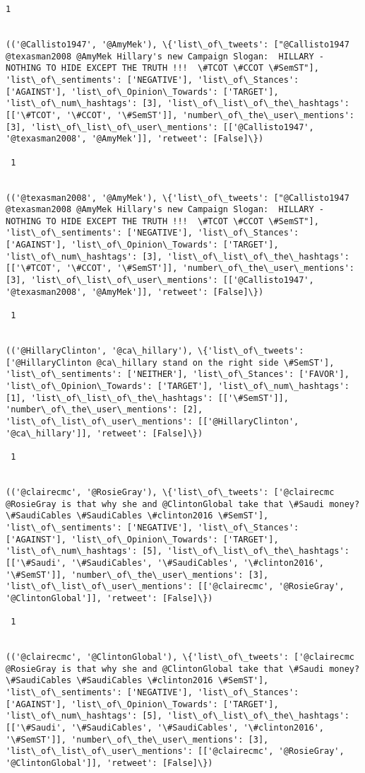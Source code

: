 \documentclass[11pt]{article}
\begin{document}
\begin{Verbatim}[commandchars=\\\{\}]
 1
 

(('@Callisto1947', '@AmyMek'), \{'list\_of\_tweets': ["@Callisto1947 @texasman2008 @AmyMek Hillary's new Campaign Slogan:  HILLARY - NOTHING TO HIDE EXCEPT THE TRUTH !!!  \#TCOT \#CCOT \#SemST"], 'list\_of\_sentiments': ['NEGATIVE'], 'list\_of\_Stances': ['AGAINST'], 'list\_of\_Opinion\_Towards': ['TARGET'], 'list\_of\_num\_hashtags': [3], 'list\_of\_list\_of\_the\_hashtags': [['\#TCOT', '\#CCOT', '\#SemST']], 'number\_of\_the\_user\_mentions': [3], 'list\_of\_list\_of\_user\_mentions': [['@Callisto1947', '@texasman2008', '@AmyMek']], 'retweet': [False]\})

 1
 

(('@texasman2008', '@AmyMek'), \{'list\_of\_tweets': ["@Callisto1947 @texasman2008 @AmyMek Hillary's new Campaign Slogan:  HILLARY - NOTHING TO HIDE EXCEPT THE TRUTH !!!  \#TCOT \#CCOT \#SemST"], 'list\_of\_sentiments': ['NEGATIVE'], 'list\_of\_Stances': ['AGAINST'], 'list\_of\_Opinion\_Towards': ['TARGET'], 'list\_of\_num\_hashtags': [3], 'list\_of\_list\_of\_the\_hashtags': [['\#TCOT', '\#CCOT', '\#SemST']], 'number\_of\_the\_user\_mentions': [3], 'list\_of\_list\_of\_user\_mentions': [['@Callisto1947', '@texasman2008', '@AmyMek']], 'retweet': [False]\})

 1
 

(('@HillaryClinton', '@ca\_hillary'), \{'list\_of\_tweets': ['@HillaryClinton @ca\_hillary stand on the right side \#SemST'], 'list\_of\_sentiments': ['NEITHER'], 'list\_of\_Stances': ['FAVOR'], 'list\_of\_Opinion\_Towards': ['TARGET'], 'list\_of\_num\_hashtags': [1], 'list\_of\_list\_of\_the\_hashtags': [['\#SemST']], 'number\_of\_the\_user\_mentions': [2], 'list\_of\_list\_of\_user\_mentions': [['@HillaryClinton', '@ca\_hillary']], 'retweet': [False]\})

 1
 

(('@clairecmc', '@RosieGray'), \{'list\_of\_tweets': ['@clairecmc @RosieGray is that why she and @ClintonGlobal take that \#Saudi money? \#SaudiCables \#SaudiCables \#clinton2016 \#SemST'], 'list\_of\_sentiments': ['NEGATIVE'], 'list\_of\_Stances': ['AGAINST'], 'list\_of\_Opinion\_Towards': ['TARGET'], 'list\_of\_num\_hashtags': [5], 'list\_of\_list\_of\_the\_hashtags': [['\#Saudi', '\#SaudiCables', '\#SaudiCables', '\#clinton2016', '\#SemST']], 'number\_of\_the\_user\_mentions': [3], 'list\_of\_list\_of\_user\_mentions': [['@clairecmc', '@RosieGray', '@ClintonGlobal']], 'retweet': [False]\})

 1
 

(('@clairecmc', '@ClintonGlobal'), \{'list\_of\_tweets': ['@clairecmc @RosieGray is that why she and @ClintonGlobal take that \#Saudi money? \#SaudiCables \#SaudiCables \#clinton2016 \#SemST'], 'list\_of\_sentiments': ['NEGATIVE'], 'list\_of\_Stances': ['AGAINST'], 'list\_of\_Opinion\_Towards': ['TARGET'], 'list\_of\_num\_hashtags': [5], 'list\_of\_list\_of\_the\_hashtags': [['\#Saudi', '\#SaudiCables', '\#SaudiCables', '\#clinton2016', '\#SemST']], 'number\_of\_the\_user\_mentions': [3], 'list\_of\_list\_of\_user\_mentions': [['@clairecmc', '@RosieGray', '@ClintonGlobal']], 'retweet': [False]\})


\end{Verbatim}
\end{document}

